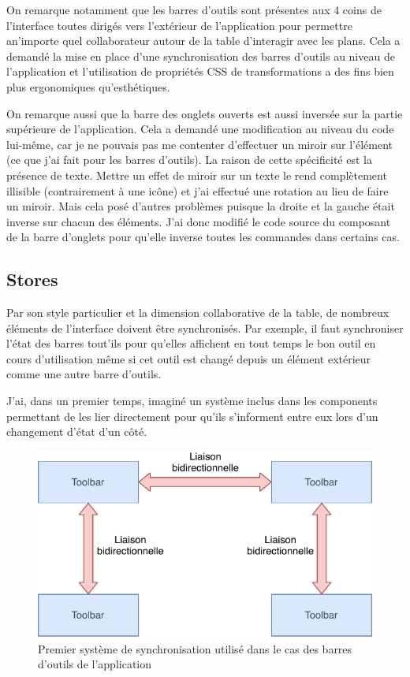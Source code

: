 On remarque notamment que les barres d'outils sont présentes aux 4 coins de l'interface toutes dirigés vers l'extérieur de l'application pour permettre an'importe quel collaborateur autour de la table d'interagir avec les plans.
Cela a demandé la mise en place d'une synchronisation des barres d'outils au niveau de l'application et l'utilisation de propriétés CSS de transformations a des fins bien plus ergonomiques qu'esthétiques.

\bigskip

On remarque aussi que la barre des onglets ouverts est aussi inversée sur la partie supérieure de l'application.
Cela a demandé une modification au niveau du code lui-même, car je ne pouvais pas me contenter d'effectuer un miroir sur l'élément (ce que j'ai fait pour les barres d'outils).
La raison de cette spécificité est la présence de texte.
Mettre un effet de miroir sur un texte le rend complètement illisible (contrairement à une icône) et j'ai effectué une rotation au lieu de faire un miroir.
Mais cela posé d'autres problèmes puisque la droite et la gauche était inverse sur chacun des éléments.
J'ai donc modifié le code source du composant de la barre d'onglets pour qu'elle inverse toutes les commandes dans certains cas.

\subsection{Stores}
\label{eiffageTablePlanStores}

Par son style particulier et la dimension collaborative de la table, de nombreux éléments de l'interface doivent être synchronisés.
Par exemple, il faut synchroniser l'état des barres tout'ils pour qu'elles affichent en tout temps le bon outil en cours d'utilisation même si cet outil est changé depuis un élément extérieur comme une autre barre d'outils.

J'ai, dans un premier temps, imaginé un système inclus dans les components permettant de les lier directement pour qu'ils s'informent entre eux lors d'un changement d'état d'un côté.

\begin{figure}[h]
    \centering
    \includegraphics[scale=1]{img/premiere-synchro.pdf}
    \caption{Premier système de synchronisation utilisé dans le cas des barres d'outils de l'application}
\end{figure}

